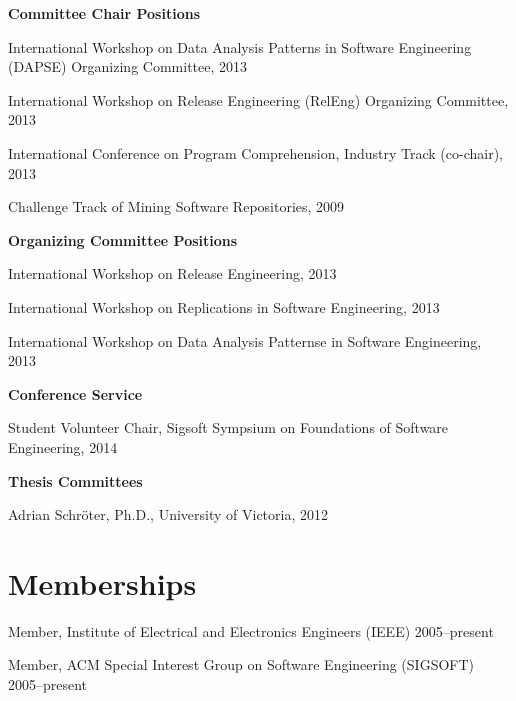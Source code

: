 \documentclass[margin,line,article,letterpaper]{res}
\newenvironment{noindentlist}{
  \begin{list}{}{%
      \setlength{\itemsep}{0in}
      \setlength{\parsep}{0in} \setlength{\parskip}{0in}
      \setlength{\topsep}{0in} \setlength{\partopsep}{0in} 
      \setlength{\leftmargin}{0in}}}{\end{list}}
\newenvironment{list1}{
  \begin{list}{}{%
      \setlength{\itemsep}{0in}
      \setlength{\parsep}{0in} \setlength{\parskip}{0in}
      \setlength{\topsep}{0in} \setlength{\partopsep}{0in} 
      \setlength{\leftmargin}{0.17in}}}{\end{list}}
\newenvironment{list2}{
  \begin{list}{$\bullet$}{%
      \setlength{\itemsep}{0in}
      \setlength{\parsep}{0in} \setlength{\parskip}{0in}
      \setlength{\topsep}{0in} \setlength{\partopsep}{0in} 
      \setlength{\leftmargin}{0.2in}}}{\end{list}}
\begin{document}
\begin{resume}
\textbf{Committee Chair Positions}
\begin{list1}
\item International Workshop on Data Analysis Patterns in Software Engineering (DAPSE) Organizing Committee, 2013
\item International Workshop on Release Engineering (RelEng) Organizing Committee, 2013
\item International Conference on Program Comprehension, Industry Track (co-chair), 2013
\item Challenge Track of Mining Software Repositories, 2009
\end{list1}

\textbf{Organizing Committee Positions}
\begin{list1}
\item International Workshop on Release Engineering, 2013
\item International Workshop on Replications in Software Engineering, 2013
\item International Workshop on Data Analysis Patternse in Software Engineering, 2013
\end{list1}

\textbf{Conference Service}
\begin{list1}
\item Student Volunteer Chair, Sigsoft Sympsium on Foundations of Software Engineering, 2014
\end{list1}

\textbf{Thesis Committees}
\begin{list1}
\item Adrian Schr\"{o}ter, Ph.D., University of Victoria, 2012
\end{list1}

\section{Memberships}
\begin{noindentlist}
\item Member, Institute of Electrical and Electronics Engineers (IEEE) \hfill 2005--present
\item Member, ACM Special Interest Group on Software Engineering (SIGSOFT) \hfill 2005--present
\end{noindentlist}



\begin{comment}
I don't think anyone cares about this
\section{Technical Skills} 
\begin{list2}
\item Proficient:  C, Java, Python, C++, PostgreSQL, MySQL, Ruby, R, \LaTeX
\item Familiar: Lisp, Prolog, C\#, SML
\end{list2}
\end{comment}


\end{resume}
\end{document}
